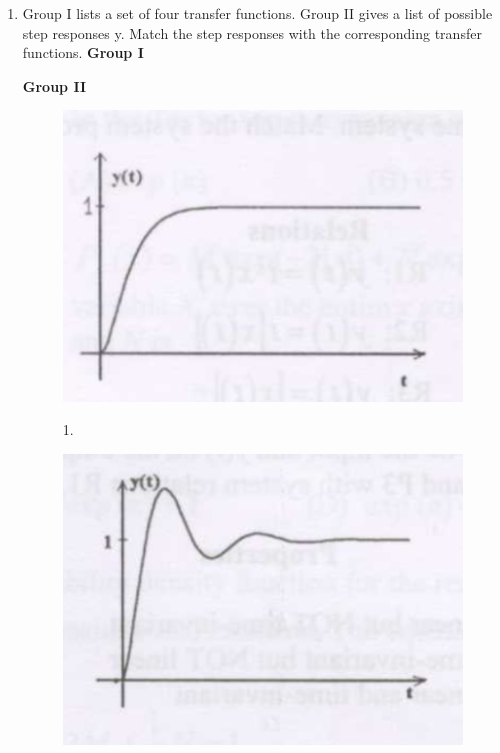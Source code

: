 \documentclass[a4paper, 11pt]{article}
\begin{document}
\begin{enumerate}
    \newpage
    \item Group I lists a set of four transfer functions. Group II gives a list of possible step responses y. Match the step responses with the corresponding transfer functions.
    \textbf{Group I}
    \begin{description}
    \end{description}
    \textbf{Group II}
    \begin{figure}[H]
        \centering
        \begin{minipage}{0.45\textwidth}
            \centering
            \includegraphics[width=0.9\columnwidth]{figs/q38A.png}
            \centerline{1.}
        \end{minipage}
        \hfill
        \begin{minipage}{0.45\textwidth}
            \centering
            \includegraphics[width=0.9\columnwidth]{figs/q38B.png}

\end{minipage}
\end{figure}
\end{enumerate}
\end{document}
